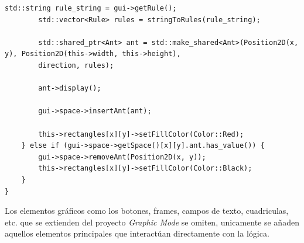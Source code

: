 \documentclass[12pt,twoside]{article}
\begin{document}
\begin{lstlisting}[caption={ButtonFunctions}, label={lst:cppexample}]
		std::string rule_string = gui->getRule();
		std::vector<Rule> rules = stringToRules(rule_string);
		
		std::shared_ptr<Ant> ant = std::make_shared<Ant>(Position2D(x, y), Position2D(this->width, this->height),
		direction, rules);
		
		ant->display();
		
		gui->space->insertAnt(ant);
		
		this->rectangles[x][y]->setFillColor(Color::Red);
	} else if (gui->space->getSpace()[x][y].ant.has_value()) {
		gui->space->removeAnt(Position2D(x, y));
		this->rectangles[x][y]->setFillColor(Color::Black);
	}
}
\end{lstlisting}

Los elementos gráficos como los botones, frames, campos de texto, cuadriculas, etc. que se extienden del proyecto \textit{Graphic Mode} se omiten, unicamente se añaden aquellos elementos principales que interactúan directamente con la lógica. 
\end{document}
